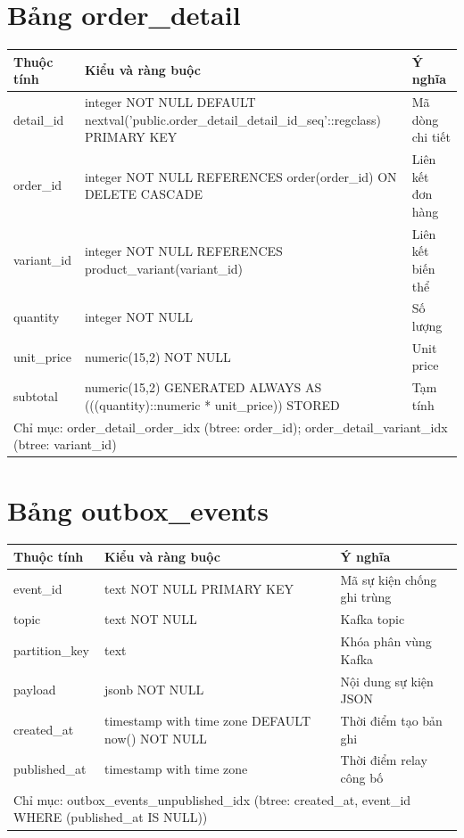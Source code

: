\section{Bảng order\_detail}
\begin{longtable}{|p{}|p{}|p{}|}\hline
\textbf{Thuộc tính}&\textbf{Kiểu và ràng buộc}&\textbf{Ý nghĩa}\\\hline\endhead
detail\_id & integer NOT NULL DEFAULT nextval('public.order\_detail\_detail\_id\_seq'::regclass) PRIMARY KEY & Mã dòng chi tiết\\\hline
order\_id & integer NOT NULL REFERENCES order(order\_id) ON DELETE CASCADE & Liên kết đơn hàng\\\hline
variant\_id & integer NOT NULL REFERENCES product\_variant(variant\_id) & Liên kết biến thể\\\hline
quantity & integer NOT NULL & Số lượng\\\hline
unit\_price & numeric(15,2) NOT NULL & Unit price\\\hline
subtotal & numeric(15,2) GENERATED ALWAYS AS (((quantity)::numeric * unit\_price)) STORED & Tạm tính\\\hline
\multicolumn{3}{|p{0.93\textwidth}|}{Chỉ mục: order\_detail\_order\_idx (btree: order\_id); order\_detail\_variant\_idx (btree: variant\_id)}\\\hline
\end{longtable}
\normalsize
\section{Bảng outbox\_events}
\begin{longtable}{|p{}|p{}|p{}|}\hline
\textbf{Thuộc tính}&\textbf{Kiểu và ràng buộc}&\textbf{Ý nghĩa}\\\hline\endhead
event\_id & text NOT NULL PRIMARY KEY & Mã sự kiện chống ghi trùng\\\hline
topic & text NOT NULL & Kafka topic\\\hline
partition\_key & text & Khóa phân vùng Kafka\\\hline
payload & jsonb NOT NULL & Nội dung sự kiện JSON\\\hline
created\_at & timestamp with time zone DEFAULT now() NOT NULL & Thời điểm tạo bản ghi\\\hline
published\_at & timestamp with time zone & Thời điểm relay công bố\\\hline
\multicolumn{3}{|p{0.93\textwidth}|}{Chỉ mục: outbox\_events\_unpublished\_idx (btree: created\_at, event\_id WHERE (published\_at IS NULL))}\\\hline
\end{longtable}
\normalsize
